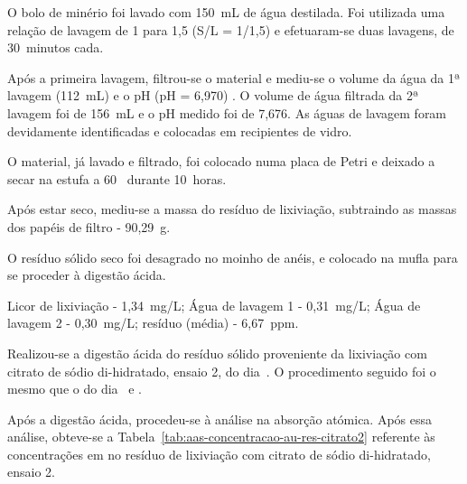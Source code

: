 O bolo de minério foi lavado com 150~mL de água destilada. 
Foi utilizada uma relação de lavagem de 1 para 1,5 (S/L = 1/1,5) e efetuaram-se duas lavagens, de 30~minutos cada.

Após a primeira lavagem, filtrou-se o material e mediu-se o volume da água da 1ª lavagem (112~mL) e o pH (pH = 6,970) .
O volume de água filtrada da 2ª lavagem foi de 156~mL e o pH medido foi de 7,676.
As águas de lavagem foram devidamente identificadas e colocadas em recipientes de vidro.

O material, já lavado e filtrado, foi colocado numa placa de Petri e deixado a secar na estufa a 60~\graus{} durante 10~horas.

Após estar seco, mediu-se a massa do resíduo de lixiviação, subtraindo as massas dos papéis de filtro - 90,29~g.

O resíduo sólido seco foi desagrado no moinho de anéis, e colocado na mufla para se proceder à digestão ácida.

 Licor de lixiviação - 1,34~mg/L; Água de lavagem 1 - 0,31~mg/L; Água de lavagem 2 - 0,30~mg/L; resíduo (média) - 6,67~ppm.

\hrulefill


Realizou-se a digestão ácida do resíduo sólido proveniente da lixiviação com citrato de sódio di-hidratado, ensaio 2, do dia~.
O procedimento seguido foi o mesmo que o do dia~ e .

Após a digestão ácida, procedeu-se à análise na absorção atómica.
Após essa análise, obteve-se a Tabela~\ref{tab:aas-concentracao-au-res-citrato2} referente às concentrações em  no resíduo de lixiviação com citrato de sódio di-hidratado, ensaio 2.

\newpage

